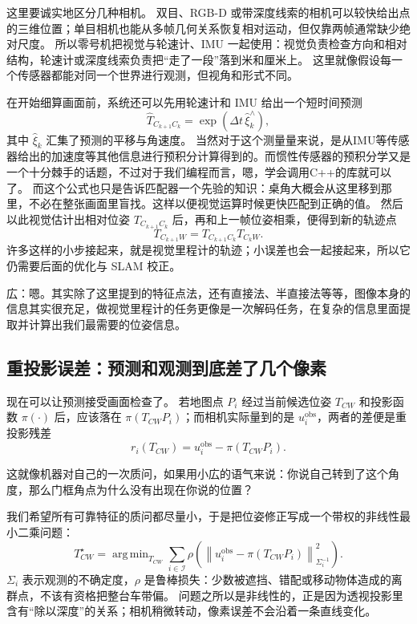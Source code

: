 这里要诚实地区分几种相机。
双目、RGB-D 或带深度线索的相机可以较快给出点的三维位置；单目相机也能从多帧几何关系恢复相对运动，但仅靠两帧通常缺少绝对尺度。
所以零号机把视觉与轮速计、IMU 一起使用：视觉负责检查方向和相对结构，轮速计或深度线索负责把“走了一段”落到米和厘米上。
这里就像假设每一个传感器都能对同一个世界进行观测，但视角和形式不同。

在开始细算画面前，系统还可以先用轮速计和 IMU 给出一个短时间预测
\begin{equation}
\widehat{T}_{C_{k+1}C_k}
=
\exp\left(\Delta t\,\widehat{\xi}_k^\wedge\right),
\label{eq:vo-prediction}
\end{equation}
其中 $\widehat{\xi}_k$ 汇集了预测的平移与角速度。
当然对于这个测量量来说，是从IMU等传感器给出的加速度等其他信息进行预积分计算得到的。而惯性传感器的预积分学又是一个十分棘手的话题，不过对于我们编程而言，嗯，学会调用C++的库就可以了。
而这个公式也只是告诉匹配器一个先验的知识：桌角大概会从这里移到那里，不必在整张画面里盲找。这样以便视觉运算时候更快匹配到正确的值。
然后以此视觉估计出相对位姿 $T_{C_{k+1}C_k}$ 后，再和上一帧位姿相乘，便得到新的轨迹点
\begin{equation}
T_{C_{k+1}W}=T_{C_{k+1}C_k}T_{C_kW}.
\label{eq:vo-trajectory}
\end{equation}
许多这样的小步接起来，就是视觉里程计的轨迹；小误差也会一起接起来，所以它仍需要后面的优化与 SLAM 校正。

広：嗯。其实除了这里提到的特征点法，还有直接法、半直接法等等，图像本身的信息其实很充足，做视觉里程计的任务更像是一次解码任务，在复杂的信息里面提取并计算出我们最需要的位姿信息。

\subsection{重投影误差：预测和观测到底差了几个像素}

现在可以让预测接受画面检查了。
若地图点 $P_i$ 经过当前候选位姿 $T_{CW}$ 和投影函数 $\pi(\cdot)$ 后，应该落在 $\pi(T_{CW}P_i)$；而相机实际量到的是 $u_i^{\mathrm{obs}}$，两者的差便是重投影残差
\begin{equation}
r_i(T_{CW})=u_i^{\mathrm{obs}}-\pi(T_{CW}P_i).
\label{eq:vo-reprojection-residual}
\end{equation}

这就像机器对自己的一次质问，如果用小広的语气来说：你说自己转到了这个角度，那么门框角点为什么没有出现在你说的位置？

我们希望所有可靠特征的质问都尽量小，于是把位姿修正写成一个带权的非线性最小二乘问题：
\begin{equation}
T_{CW}^{\star}=
\mathop{\mathrm{arg\,min}}_{T_{CW}}
\sum_{i\in\mathcal I}
\rho\!\left(
\left\|u_i^{\mathrm{obs}}-\pi(T_{CW}P_i)\right\|^2_{\Sigma_i^{-1}}
\right).
\label{eq:vo-motion-only-ba}
\end{equation}
$\Sigma_i$ 表示观测的不确定度，$\rho$ 是鲁棒损失：少数被遮挡、错配或移动物体造成的离群点，不该有资格把整台车带偏。
问题之所以是非线性的，正是因为透视投影里含有“除以深度”的关系；相机稍微转动，像素误差不会沿着一条直线变化。

